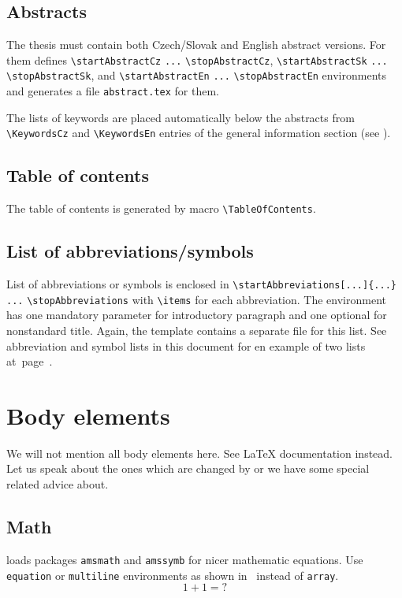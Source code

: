 \subsection{Abstracts}
The thesis must contain both Czech/Slovak and English abstract
versions. For them \FelThesis{} defines \verb+\startAbstractCz+ \verb+...+
\verb+\stopAbstractCz+, \verb+\startAbstractSk+ \verb+...+
\verb+\stopAbstractSk+, and \verb+\startAbstractEn+ \verb+...+
\verb+\stopAbstractEn+ environments and generates a file
\verb+abstract.tex+ for them. 

The lists of keywords are placed automatically below the abstracts from
\verb+\KeywordsCz+ and \verb+\KeywordsEn+ entries of the
general information section (see ).

\subsection{Table of contents}
The table of contents is generated by macro \verb+\TableOfContents+.

\subsection{List of abbreviations/symbols}
List of abbreviations or symbols is enclosed in
\verb+\startAbbreviations[...]{...}+ \verb+...+ \verb+\stopAbbreviations+ with
\verb+\items+ for each abbreviation. The environment has one mandatory
parameter for introductory paragraph and one optional for nonstandard title.
Again, the template contains a separate file for this list. See
abbreviation and symbol lists in this document for en example of two
lists at~page~\pageref{abbrv}.

\section{Body elements}
We will not mention all body elements here. See \LaTeX{}
documentation instead. Let us speak about the ones which are
changed by \FelThesis{} or we have some special related advice about.

\subsection{Math}
\FelThesis{} loads packages \verb+amsmath+ and \verb+amssymb+ for nicer mathematic
equations. Use \verb+equation+ or \verb+multiline+ environments as
shown in~\cite{amsmath} instead of \verb+array+.
\begin{equation}
  1+1= \mathord{?}
\end{equation}

